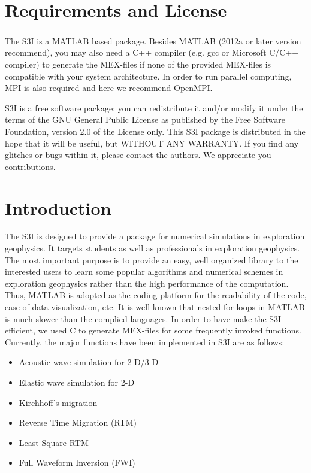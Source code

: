 \documentclass[11pt,titlepage]{article}
\theoremstyle{plain}
\theoremstyle{definition}
\theoremstyle{remark}
\numberwithin{equation}{section}
\begin{document}

\tableofcontents
\newpage



\section{Requirements and License}
The S3I is a MATLAB\textsuperscript{\textregistered} based package. Besides MATLAB (2012a or later version recommend), you may also need a C++ compiler (e.g. gcc or Microsoft C/C++ compiler) to generate the MEX-files if none of the provided MEX-files is compatible with your system architecture. In order to run parallel computing, MPI is also required and here we recommend OpenMPI.

S3I is a free software package: you can redistribute it and/or modify it under the terms of the GNU General Public License as published by the Free Software Foundation, version 2.0 of the License only. This S3I package is distributed in the hope that it will be useful, but WITHOUT ANY WARRANTY. If you find any glitches or bugs within it, please contact the authors. We appreciate you contributions. 



\section{Introduction}
The S3I is designed to provide a package for numerical simulations in exploration geophysics. It targets students as well as professionals in exploration geophysics. The most important purpose is to provide an easy, well organized library to the interested users to learn some popular algorithms and numerical schemes in exploration geophysics rather than the high performance of the computation. Thus, MATLAB is adopted as the coding platform for the readability of the code, ease of data visualization, etc. It is well known that nested for-loops in MATLAB is much slower than the complied languages. In order to have make the S3I efficient, we used C to generate MEX-files for some frequently invoked functions. Currently, the major functions have been implemented in S3I are as follows:
\begin{itemize}
\item Acoustic wave simulation for 2-D/3-D
\item Elastic wave simulation for 2-D
\item Kirchhoff's migration
\item Reverse Time Migration (RTM)
\item Least Square RTM
\item Full Waveform Inversion (FWI)
\end{itemize}
\end{document}
